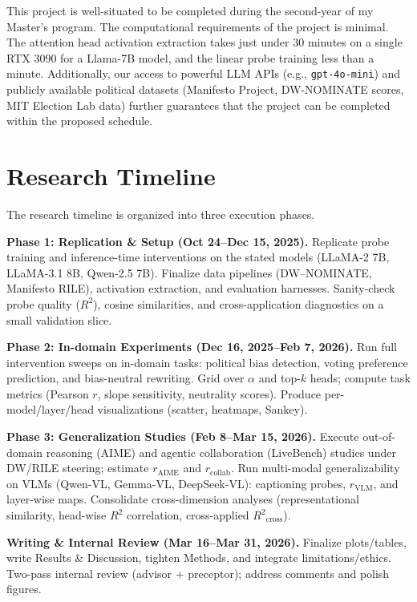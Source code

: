 \documentclass[11pt]{article}
\begin{document}
This project is well-situated to be completed during the second-year of my Master’s program. The computational requirements of the project is minimal. The attention head activation extraction takes just under 30 minutes on a single RTX 3090 for a Llama-7B model, and the linear probe training less than a minute. Additionally, our access to powerful LLM APIs (e.g., \texttt{gpt-4o-mini}) and publicly available political datasets (Manifesto Project, DW-NOMINATE scores, MIT Election Lab data) further guarantees that the project can be completed within the proposed schedule.

\section*{Research Timeline}

The research timeline is organized into three execution phases.

\textbf{Phase 1: Replication \& Setup (Oct 24--Dec 15, 2025).}  
Replicate probe training and inference-time interventions on the stated models (LLaMA-2 7B, LLaMA-3.1 8B, Qwen-2.5 7B). Finalize data pipelines (DW--NOMINATE, Manifesto RILE), activation extraction, and evaluation harnesses. Sanity-check probe quality ($R^2$), cosine similarities, and cross-application diagnostics on a small validation slice.

\textbf{Phase 2: In-domain Experiments (Dec 16, 2025--Feb 7, 2026).}  
Run full intervention sweeps on in-domain tasks: political bias detection, voting preference prediction, and bias-neutral rewriting. Grid over $\alpha$ and top-$k$ heads; compute task metrics (Pearson $r$, slope sensitivity, neutrality scores). Produce per-model/layer/head visualizations (scatter, heatmaps, Sankey).

\textbf{Phase 3: Generalization Studies (Feb 8--Mar 15, 2026).}  
Execute out-of-domain reasoning (AIME) and agentic collaboration (LiveBench) studies under DW/RILE steering; estimate $r_{\text{AIME}}$ and $r_{\text{collab}}$. Run multi-modal generalizability on VLMs (Qwen-VL, Gemma-VL, DeepSeek-VL): captioning probes, $r_{\text{VLM}}$, and layer-wise maps. Consolidate cross-dimension analyses (representational similarity, head-wise $R^2$ correlation, cross-applied ${R^2}_{\text{cross}}$).

\textbf{Writing \& Internal Review (Mar 16--Mar 31, 2026).}  
Finalize plots/tables, write Results \& Discussion, tighten Methods, and integrate limitations/ethics. Two-pass internal review (advisor + preceptor); address comments and polish figures.
\end{document}
